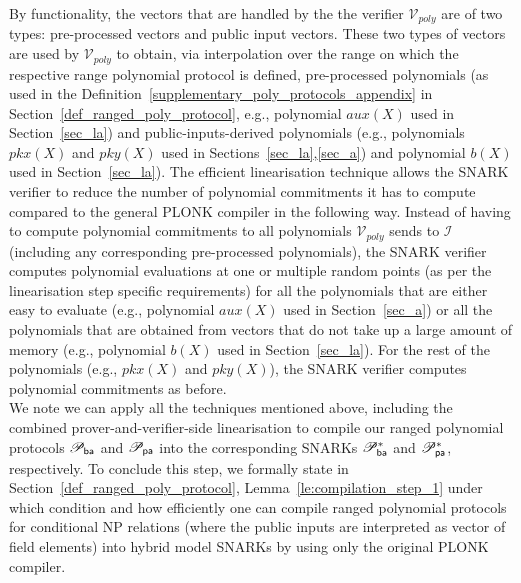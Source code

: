 \noindent By functionality, the vectors that are handled by the the verifier $\mathcal{V}_{poly}$ are 
of two types: pre-processed vectors and public input vectors. These two types of vectors are used by $\mathcal{V}_{poly}$ 
to obtain, via interpolation over the range on which the respective range polynomial protocol is defined, pre-processed polynomials 
(as used in the Definition~\ref{supplementary_poly_protocols_appendix} in Section~\ref{def_ranged_poly_protocol}, e.g., polynomial $aux(X)$ used in Section~\ref{sec_la}) and 
public-inputs-derived polynomials (e.g., polynomials $pkx(X)$ and $pky(X)$ used in Sections~\ref{sec_la},\ref{sec_a})
and polynomial $b(X)$ used in Section~\ref{sec_la}). The efficient linearisation technique allows the SNARK verifier to reduce the 
number of polynomial commitments it has to compute compared to the general PLONK compiler in the following way. Instead of 
having to compute polynomial commitments to all polynomials $\mathcal{V}_{poly}$ sends to $\mathcal{I}$ (including any corresponding 
pre-processed polynomials), the SNARK verifier computes polynomial evaluations at one or multiple random points (as per the linearisation 
step specific requirements) for all the polynomials that are either easy to evaluate (e.g., polynomial $aux(X)$ used in Section~\ref{sec_a}) or 
all the polynomials that are obtained from vectors that do not take up a large amount of memory (e.g., polynomial $b(X)$ used in Section~\ref{sec_la}). 
For the rest of the polynomials (e.g., $\mathit{pkx}(X)$ and $\mathit{pky}(X)$), the SNARK verifier computes polynomial commitments as before.\\

\noindent We note we can apply all the techniques mentioned above, including the combined prover-and-verifier-side linearisation 
to compile our ranged polynomial protocols $\mathscr{P}_{\mathsf{ba}}$ and $\mathscr{P}_{\mathsf{pa}}$ into the corresponding SNARKs $\mathscr{P}_{\mathsf{ba}}^{\ast}$ and $\mathscr{P}_{\mathsf{pa}}^{\ast}$, respectively. 
To conclude this step, we formally state in Section~\ref{def_ranged_poly_protocol}, Lemma~\ref{le:compilation_step_1} under which condition and how efficiently 
one can compile ranged polynomial protocols for conditional NP relations (where the public inputs are interpreted as vector of field elements) 
into hybrid model SNARKs by using only the original PLONK compiler. \\

